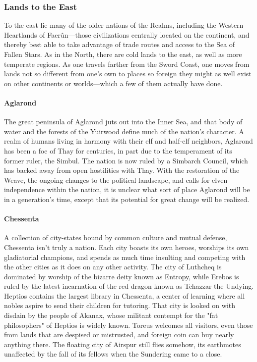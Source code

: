 \documentclass[10pt,a4paper,twoside,twocolumn,openany,bg=print,nodeprecatedcode]{dndbook}
\begin{document}
\subsubsection{Lands to the East}
To the east lie many of the older nations of the Realms, including the Western Heartlands of Faerûn—those civilizations centrally located on the continent, and thereby best able to take advantage of trade routes and access to the Sea of Fallen Stars. As in the North, there are cold lands to the east, as well as more temperate regions. As one travels farther from the Sword Coast, one moves from lands not so different from one's own to places so foreign they might as well exist on other continents or worlds—which a few of them actually have done.
\paragraph{Aglarond}
The great peninsula of Aglarond juts out into the Inner Sea, and that body of water and the forests of the Yuirwood define much of the nation's character. A realm of humans living in harmony with their elf and half-elf neighbors, Aglarond has been a foe of Thay for centuries, in part due to the temperament of its former ruler, the Simbul. The nation is now ruled by a Simbarch Council, which has backed away from open hostilities with Thay. With the restoration of the Weave, the ongoing changes to the political landscape, and calls for elven independence within the nation, it is unclear what sort of place Aglarond will be in a generation's time, except that its potential for great change will be realized.
\paragraph{Chessenta}
A collection of city-states bound by common culture and mutual defense, Chessenta isn't truly a nation. Each city boasts its own heroes, worships its own gladiatorial champions, and spends as much time insulting and competing with the other cities as it does on any other activity. The city of Luthcheq is dominated by worship of the bizarre deity known as Entropy, while Erebos is ruled by the latest incarnation of the red dragon known as Tchazzar the Undying. Heptios contains the largest library in Chessenta, a center of learning where all nobles aspire to send their children for tutoring. That city is looked on with disdain by the people of Akanax, whose militant contempt for the "fat philosophers" of Heptios is widely known. Toreus welcomes all visitors, even those from lands that are despised or mistrusted, and foreign coin can buy nearly anything there. The floating city of Airspur still flies somehow, its earthmotes unaffected by the fall of its fellows when the Sundering came to a close.
\end{document}
